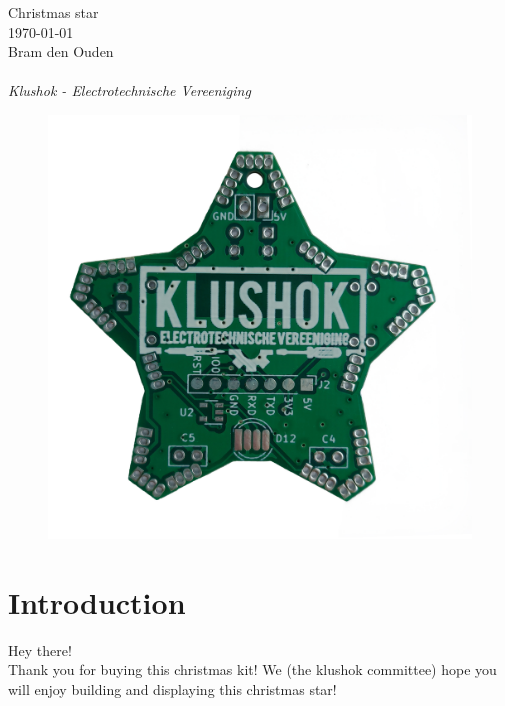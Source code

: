 \documentclass[12pt]{article}
\begin{document}
\raggedright

\begin{center}
	\LARGE{Christmas star}\\
	\large{\today}\\
	\normalsize{Bram den Ouden}\\
	~\\
	\large{\emph{Klushok - Electrotechnische Vereeniging}}\\
\end{center}



\reversemarginpar

\begin{figure}[H]
	\centering
	\includegraphics[width=\textwidth]{../images/manual/star.jpg} %
\end{figure}

\section{Introduction}

Hey there! \\
Thank you for buying this christmas kit! We (the klushok committee) hope you will enjoy building and displaying this christmas star!
\end{document}
